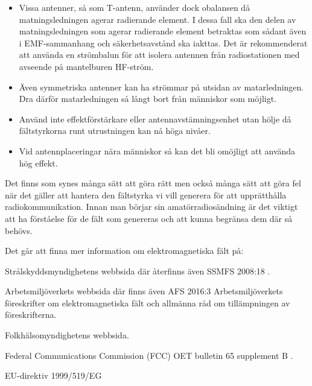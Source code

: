 \begin{itemize}
	\item Vissa antenner, så som T-antenn, använder dock obalansen då
	matningsledningen agerar radierande element.
	I dessa fall ska den delen av matningsledningen som agerar radierande element
	betraktas som sådant även i EMF-sammanhang och säkerhetsavstånd ska iakttas.
	Det är rekommenderat att använda en strömbalun för att isolera antennen från
	radiostationen med avseende på mantelburen HF-ström.
	
	\item Även symmetriska antenner kan ha strömmar på utsidan av matarledningen.
	Dra därför matarledningen så långt bort från människor som möjligt.
	
	\item Använd inte effektförstärkare eller antennavstämningsenhet utan
	hölje då fältstyrkorna runt utrustningen kan nå höga nivåer.
	
	\item Vid antennplaceringar nära människor så kan det bli omöjligt att
	använda hög effekt.
\end{itemize}

Det finns som synes många sätt att göra rätt men också många sätt att göra fel
när det gäller att hantera den fältstyrka vi vill generera för att upprätthålla
radiokommunikation.
Innan man börjar sin amatörradiosändning är det viktigt att ha förståelse för
de fält som genereras och att kunna begränsa dem där så behövs.

Det går att finna mer information om elektromagnetiska fält på:

Strålskyddsmyndighetens webbsida där återfinns även SSMFS 2008:18 \cite{SSMFS2008:18}.

Arbetsmiljöverkets webbsida där finns även AFS 2016:3 Arbetsmiljöverkets
föreskrifter om elektromagnetiska fält och allmänna råd om tillämpningen av
föreskrifterna.

Folkhälsomyndighetens webbsida.

Federal Communications Commission (FCC) OET bulletin 65 supplement B \cite{OETbul65b}.

EU-direktiv 1999/519/EG \cite{1999/519/EG}
